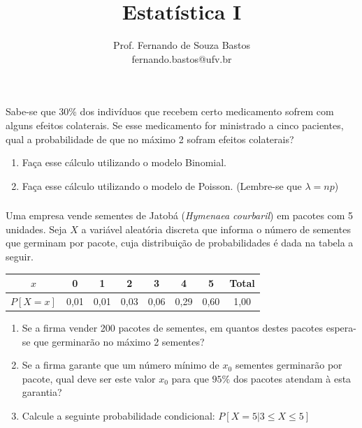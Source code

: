 \documentclass[14pt,aspectratio=1610]{beamer}
\title{Estatística I}
\author{Prof. Fernando de Souza Bastos \texorpdfstring{\\ fernando.bastos@ufv.br}{}}
\institute{Departamento de Estatística \texorpdfstring{\\ Universidade Federal de Viçosa}{}\texorpdfstring{\\ Campus UFV - Viçosa}{}}
\date{}
\begin{document}
%

\frame{\titlepage}


\begin{frame}{}
\frametitle{}
\begin{block}{}
\justifying
Sabe-se que 30\% dos indivíduos que recebem certo medicamento sofrem com alguns efeitos colaterais. Se esse medicamento for ministrado a cinco pacientes, qual a probabilidade de que no máximo 2 sofram efeitos colaterais?
\begin{enumerate}
\item Faça esse cálculo utilizando o modelo Binomial.
\item Faça esse cálculo utilizando o modelo de Poisson. (Lembre-se que $\lambda=np$)
\end{enumerate}

\end{block}
\end{frame}

\begin{frame}{}
\frametitle{}
\begin{block}{}
\justifying
\footnotesize
Uma empresa vende sementes de Jatobá (\emph{Hymenaea courbaril}) em pacotes com 5 unidades. Seja $X$ a variável aleatória discreta que informa o número de sementes que germinam por pacote, cuja distribuição de probabilidades é dada na tabela a seguir.
\begin{table}[!htbp]
\centering
\begin{tabular}{c|cccccc|c}
$x$&0&1&2&3&4&5&Total \\ \hline
$P\left[X=x\right]$&0,01&0,01&0,03&0,06&0,29&0,60&1,00\\
\end{tabular}
\end{table}

\begin{enumerate}
\item Se a firma vender 200 pacotes de sementes, em quantos destes pacotes espera-se que germinarão no máximo 2 sementes?
\item Se a firma garante que um número mínimo de $x_0$ sementes germinarão por pacote, qual deve ser este valor $x_0$ para que $95\%$ dos pacotes atendam à esta garantia?
\item Calcule a seguinte probabilidade condicional: $P \left[X=5\left.\right|3\leq X\leq5\right]$
\end{enumerate}
\end{block}
\end{frame}
\end{document}
